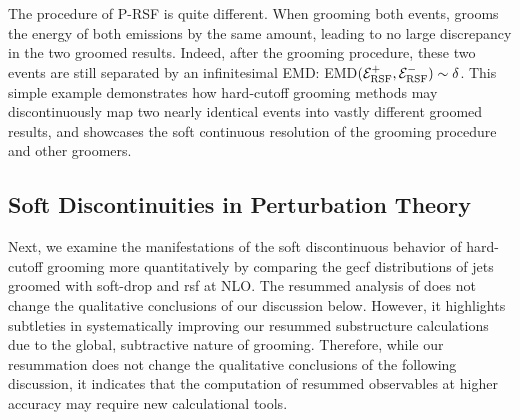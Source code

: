 The procedure of P-RSF is quite different.
%
When grooming both events,  grooms the energy of both emissions by the same amount, leading to no large discrepancy in the two groomed results.
%
Indeed, after the  grooming procedure, these two events are still separated by an infinitesimal EMD:
EMD\((\mathcal{E}^+_{\rm RSF},
\mathcal{E}^-_{\rm RSF})\sim\delta\).
%
This simple example demonstrates how hard-cutoff grooming methods may discontinuously map two nearly identical events into vastly different groomed results, and showcases the soft continuous resolution of the  grooming procedure and other \PIRANHA{} groomers.



\subsection{Soft Discontinuities in Perturbation Theory}
\label{sec:sd_discont_lo}

Next, we examine the manifestations of the soft discontinuous behavior of hard-cutoff grooming more quantitatively by comparing the \gls{gecf} distributions of jets groomed with \gls{soft-drop} and \gls{rsf} at NLO.
%
The resummed analysis of  does not change the qualitative conclusions of our discussion below.
%
However, it highlights subtleties in systematically improving our resummed substructure calculations due to the global, subtractive nature of \PIRANHA{} grooming.
%
Therefore, while our resummation does not change the qualitative conclusions of the following discussion, it indicates that the computation of resummed \PIRANHA{} observables at higher accuracy may require new calculational tools.



